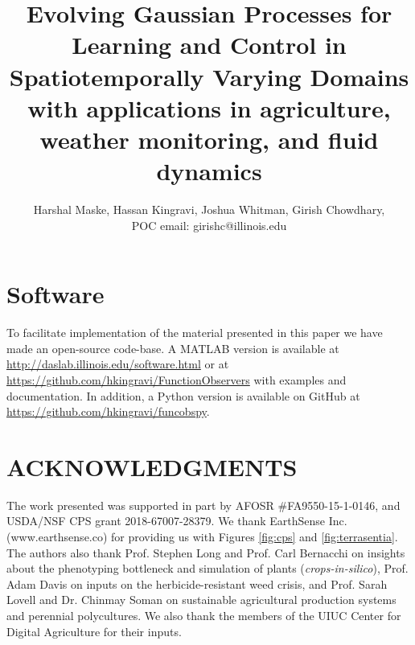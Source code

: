 \documentclass[letterpaper,12pt,peerreviewca,draftcls]{IEEEtran}
\title{Evolving Gaussian Processes for Learning and Control in Spatiotemporally Varying Domains\\\Large with applications in agriculture, weather monitoring, and fluid dynamics}
\author{Harshal Maske, Hassan Kingravi, Joshua Whitman, Girish Chowdhary, \\ POC email: girishc@illinois.edu}
\newcommand{\mX}[1]{\added[id=ml,remark={}]{#1}}
\newcommand{\bX}[1]{\added[id=bc,remark={}]{#1}}
\begin{document}
\maketitle
\CSMsetup
\linenumbers \modulolinenumbers[5] %







   

%


\section{Software}
To facilitate implementation of the material presented in this paper we have made an open-source code-base. A MATLAB version is available at \url{http://daslab.illinois.edu/software.html} or at \url{https://github.com/hkingravi/FunctionObservers} with examples and documentation. In addition, a  Python version is available on GitHub at \url{https://github.com/hkingravi/funcobspy}.

\section{ACKNOWLEDGMENTS}
The work presented was supported in part by AFOSR \#FA9550-15-1-0146, %
and USDA/NSF CPS grant 2018-67007-28379.  We thank EarthSense Inc. (www.earthsense.co) for providing us with Figures \ref{fig:cps} and \ref{fig:terrasentia}. The authors also thank Prof. Stephen Long and Prof. Carl Bernacchi on insights about the phenotyping bottleneck and simulation of plants (\textit{crops-in-silico}), Prof. Adam Davis on inputs on the herbicide-resistant weed crisis, and Prof. Sarah Lovell and Dr. Chinmay Soman on sustainable agricultural production systems and perennial polycultures. We also thank the members of the UIUC Center for Digital Agriculture for their inputs.

\end{document}
